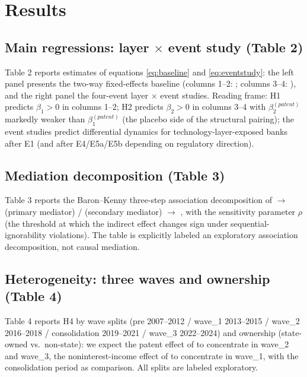 \section{Results}\label{sec:results}

\subsection{Main regressions: layer $\times$ event study (Table 2)}

Table 2 reports estimates of equations \eqref{eq:baseline} and \eqref{eq:eventstudy}:
the left panel presents the two-way fixed-effects baseline (columns 1--2:
; columns 3--4: ),
and the right panel the four-event layer $\times$ event studies. Reading frame: H1
predicts $\beta_1>0$ in columns 1--2; H2 predicts $\beta_2>0$ in columns 3--4 with
$\beta_2^{(patent)}$ markedly weaker than $\beta_1^{(patent)}$ (the placebo side of the
structural pairing); the event studies predict differential dynamics for
technology-layer-exposed banks after E1 (and after E4/E5a/E5b depending on regulatory
direction). 

\subsection{Mediation decomposition (Table 3)}

Table 3 reports the Baron--Kenny three-step association decomposition of
 $\to$  (primary mediator) /
 (secondary mediator) $\to$
 \parencite{baron1986moderator}, with the
\textcite{imai2010general} sensitivity parameter $\rho$ (the threshold at which the
indirect effect changes sign under sequential-ignorability violations). The table is
explicitly labeled an exploratory association decomposition, not causal mediation.

\subsection{Heterogeneity: three waves and ownership (Table 4)}

Table 4 reports H4 by wave splits (pre 2007--2012 / wave\_1 2013--2015 / wave\_2
2016--2018 / consolidation 2019--2021 / wave\_3 2022--2024) and ownership (state-owned
vs.\ non-state): we expect the patent effect of  to concentrate
in wave\_2 and wave\_3, the noninterest-income effect of 
to concentrate in wave\_1, with the consolidation period as comparison. All splits are
labeled exploratory. 

